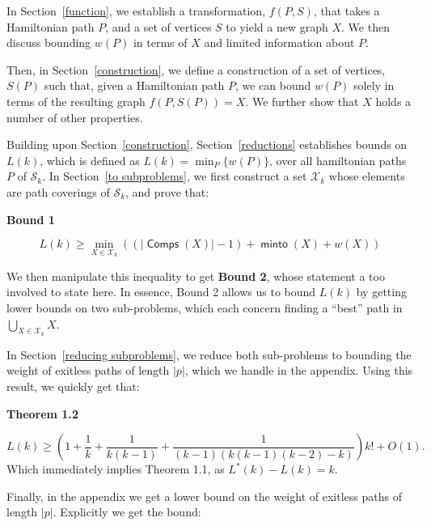 \documentclass{article}
\DeclareMathOperator{\minto}{\bm{\mathsf{minto}}}
\DeclareMathOperator{\Comp}{\bm{\mathsf{Comps}}}
\newcommand{\edit}[1]{}%
\newcommand{\dc}[1]{}%
\begin{document}
In Section~\ref{function}, we establish a transformation, $f(P,S)$, that takes a Hamiltonian path $P$, and a set of vertices $S$ to yield a new graph $X$. We then discuss bounding $w(P)$ in terms of $X$ and limited information about $P$.

Then, in Section~\ref{construction}, we define a construction of a set of vertices, $S(P)$ such that, given a Hamiltonian path $P$, we can bound $w(P)$ solely in terms of the resulting graph $f(P,S(P)) = X$. We further show that $X$ holds a number of other properties.\dc{ ``which are...'' or ``which let us...''}

\edit{summary of section 5 worked better in last version} Building upon Section~\ref{construction}, Section~\ref{reductions} establishes bounds on $L(k)$, which is defined as $L(k) = \min_{P}\{w(P)\}$, over all hamiltonian paths $P$ of $\mathcal{S}_k$. In Section~\ref{to subproblems}, we first construct a set $\mathcal{X}_k$ whose elements are path coverings of $\mathcal{S}_k$, and prove that:

\textbf{Bound 1}\edit{ use amsthm}

\[ L(k) \geq \min_{X \in \mathcal{X}_k}\left((|\Comp(X)|-1) + \minto(X) + w(X)\right) \]
\dc{Change definition of $\mathcal{X}$ to be dependent on $k$, so $\mathcal{X}_k$ makes sense.}

We then manipulate this inequality to get \textbf{Bound 2}\dc{ label/ref}, whose statement a too involved to state here. In essence, Bound 2 allows us to bound $L(k)$ by getting lower bounds on two sub-problems, which each concern finding a ``best''\dc{ ?} path in $\bigcup_{X \in \mathcal{X}_k} X$.\dc{ this paragraph is very mysterious and that's bad. You should be either more or less specific than you are now (probably more).}

In Section~\ref{reducing subproblems}, we reduce both sub-problems to bounding the weight of exitless paths of length $|p|$, which we handle in the appendix. Using this result, we quickly get that:

\textbf{Theorem 1.2}\edit{ amsthm again}\dc{ label/ref since you will most likely state/prove this again later, but do amsthm first obviously}

\[L(k) \ge \left(1+ \frac{1}{k} + \frac{1}{k(k-1)} + \frac{1}{(k-1)(k(k-1)(k-2)-k)}\right)k! +O(1). \]Which immediately implies Theorem 1.1, as $L^*(k)-L(k) = k$.


Finally, in the appendix we get a lower bound on the weight of exitless paths of length $|p|$. Explicitly we get the bound:
\end{document}

